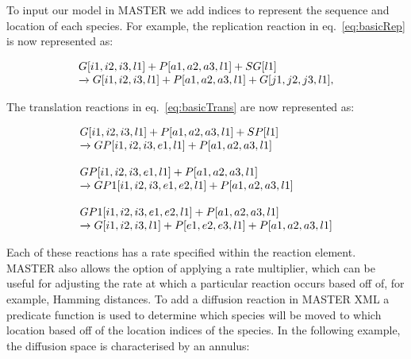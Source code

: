 \documentclass{article}
\begin{document}
To input our model in MASTER \cite{MASTER} we add indices to represent the sequence and location of each species.  For example, the replication reaction in eq.~\ref{eq:basicRep} is now represented as:

\begin{equation}
 \begin{array}{l l}
 G[i1,i2,i3,l1] + P[a1,a2,a3,l1] + SG[l1]\\
 
\xrightarrow[]{} G[i1,i2,i3,l1] + P[a1,a2,a3,l1] + G[j1,j2,j3,l1],\\
\end{array}
\label{eq:masterRep}
\end{equation}

The translation reactions in eq.~\ref{eq:basicTrans} are now represented as:

\begin{equation}
 \begin{array}{l l}
G[i1,i2,i3,l1] + P[a1,a2,a3,l1] + SP[l1] \\

\xrightarrow[]{} GP[i1,i2,i3,e1,l1] + P[a1,a2,a3,l1] \\
\\
GP[i1,i2,i3,e1,l1] + P[a1,a2,a3,l1] \\

\xrightarrow[]{} GP1[i1,i2,i3,e1,e2,l1] + P[a1,a2,a3,l1] \\
\\
GP1[i1,i2,i3,e1,e2,l1] + P[a1,a2,a3,l1] \\

\xrightarrow[]{} G[i1,i2,i3,l1] + P[e1,e2,e3,l1] + P[a1,a2,a3,l1] \\
\end{array}
\label{eq:masterTrans}
\end{equation}

\vspace{2mm}
Each of these reactions has a rate specified within the reaction element.  MASTER also allows the option of applying a rate multiplier, which can be useful for adjusting the rate at which a particular reaction occurs based off of, for example, Hamming distances.
To add a diffusion reaction in MASTER XML a predicate function is used to determine which species will be moved to which location based off of the location indices of the species.  
In the following example, the diffusion space is characterised by an annulus:
\end{document}
